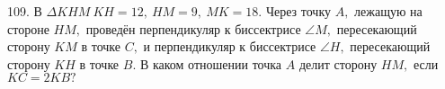 109. В $\Delta KHM\ KH=12,\ HM=9,\ MK=18.$ Через точку $A,$ лежащую на стороне $HM,$ проведён перпендикуляр к биссектрисе $\angle M,$ пересекающий сторону $KM$ в точке $C,$ и перпендикуляр к биссектрисе $\angle H,$ пересекающий сторону $KH$ в точке $B.$ В каком отношении точка $A$ делит сторону $HM,$ если $KC=2KB?$\\
